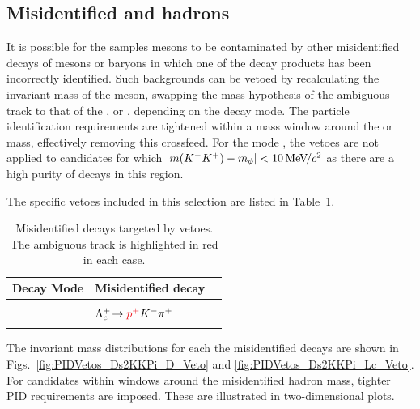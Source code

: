 \subsection{Misidentified \D and \Lc hadrons}
\label{sec:pidvetos}

It is possible for the samples \Dsp mesons to be contaminated by other misidentified decays of \Dp mesons or \Lc baryons in which one of the decay products has been incorrectly identified.
Such backgrounds can be vetoed by recalculating the invariant mass of the \Dsp meson, swapping the mass hypothesis of the ambiguous track to that of the \kaon, \pion or \proton, depending on the decay mode. 
The particle identification requirements are tightened within a mass window around the \Dp or \Lc mass, effectively removing this crossfeed. For the mode \decay{\Dsp}{\Kp\Km\pip}, the vetoes are not applied to candidates for which $|m({{K}^-}{{K}^+})-m_{\phi}| < 10{\mathrm{\,Me\kern -0.1em V\!/}c^2}$ as there are a high purity of \decay{\Dsp}{\Kp\Km\pip} decays in this region.

The specific vetoes included in this selection are listed in Table~\ref{table:pidvetos}. 
\begin{table}[!ht]
\centering
\begin{tabular}{ l l l }
\hline
Decay Mode & Misidentified decay\\
\hline
\decay{\Dsp}{{\color{Red}\Kp}\Km\pip}   & \decay{\Dp}{{\color{Red}\pip}\Km\pip}    \\
                           & $\decay{\Lc}{{\color{Red}\Pp^{+}}\Km\pip}$     \\
\hline
\decay{\Dsp}{{\color{Red}\Kp}\pim\pip}  & \decay{\Dp}{{\color{Red}\pip}\pim\pip}   \\

\hline
\end{tabular}
\caption{Misidentified decays targeted by vetoes. The ambiguous track is highlighted in red in each case.}
\label{table:pidvetos}

\end{table}
The invariant mass distributions for each the misidentified \decay{\Dsp}{\Kp\Km\pip} decays are shown in Figs.~\ref{fig:PIDVetos_Ds2KKPi_D_Veto} and \ref{fig:PIDVetos_Ds2KKPi_Lc_Veto}. For candidates within windows around the misidentified hadron mass, tighter PID requirements are imposed. These are illustrated in two-dimensional plots. 



